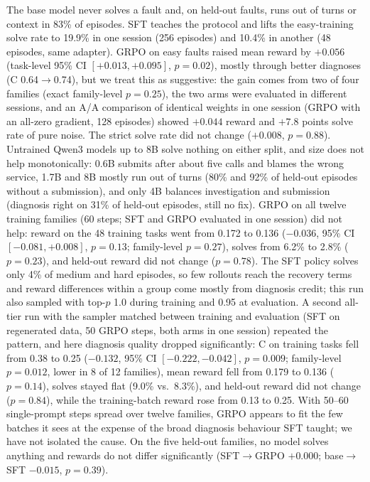 \documentclass[11pt]{article}
\begin{document}
The base model never solves a fault and, on held-out faults, runs out of turns or context in 83\% of episodes. SFT teaches the protocol and lifts the easy-training solve rate to 19.9\% in one session (256 episodes) and 10.4\% in another (48 episodes, same adapter). GRPO on easy faults raised mean reward by $+0.056$ (task-level 95\% CI $[+0.013, +0.095]$, $p=0.02$), mostly through better diagnoses (C 0.64$\to$0.74), but we treat this as suggestive: the gain comes from two of four families (exact family-level $p=0.25$), the two arms were evaluated in different sessions, and an A/A comparison of identical weights in one session (GRPO with an all-zero gradient, 128 episodes) showed $+0.044$ reward and $+7.8$ points solve rate of pure noise. The strict solve rate did not change ($+0.008$, $p=0.88$). Untrained Qwen3 models up to 8B solve nothing on either split, and size does not help monotonically: 0.6B submits after about five calls and blames the wrong service, 1.7B and 8B mostly run out of turns (80\% and 92\% of held-out episodes without a submission), and only 4B balances investigation and submission (diagnosis right on 31\% of held-out episodes, still no fix). GRPO on all twelve training families (60 steps; SFT and GRPO evaluated in one session) did not help: reward on the 48 training tasks went from 0.172 to 0.136 ($-0.036$, 95\% CI $[-0.081, +0.008]$, $p=0.13$; family-level $p=0.27$), solves from 6.2\% to 2.8\% ($p=0.23$), and held-out reward did not change ($p=0.78$). The SFT policy solves only 4\% of medium and hard episodes, so few rollouts reach the recovery terms and reward differences within a group come mostly from diagnosis credit; this run also sampled with top-$p$ 1.0 during training and 0.95 at evaluation. A second all-tier run with the sampler matched between training and evaluation (SFT on regenerated data, 50 GRPO steps, both arms in one session) repeated the pattern, and here diagnosis quality dropped significantly: C on training tasks fell from 0.38 to 0.25 ($-0.132$, 95\% CI $[-0.222, -0.042]$, $p=0.009$; family-level $p=0.012$, lower in 8 of 12 families), mean reward fell from 0.179 to 0.136 ($p=0.14$), solves stayed flat (9.0\% vs.\ 8.3\%), and held-out reward did not change ($p=0.84$), while the training-batch reward rose from 0.13 to 0.25. With 50--60 single-prompt steps spread over twelve families, GRPO appears to fit the few batches it sees at the expense of the broad diagnosis behaviour SFT taught; we have not isolated the cause. On the five held-out families, no model solves anything and rewards do not differ significantly (SFT$\to$GRPO $+0.000$; base$\to$SFT $-0.015$, $p=0.39$).
\end{document}
